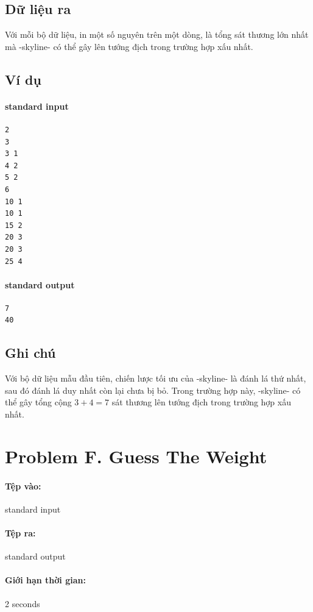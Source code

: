 \documentclass[11pt]{article}
\begin{document}
\subsection*{Dữ liệu ra}

Với mỗi bộ dữ liệu, in một số nguyên trên một dòng, là tổng sát thương lớn
nhất mà -skyline- có thể gây lên tướng địch trong trường hợp xấu nhất.

\subsection*{Ví dụ}

\paragraph{standard input}
\begin{verbatim}
2
3
3 1
4 2
5 2
6
10 1
10 1
15 2
20 3
20 3
25 4
\end{verbatim}

\paragraph{standard output}
\begin{verbatim}
7
40
\end{verbatim}

\subsection*{Ghi chú}

Với bộ dữ liệu mẫu đầu tiên, chiến lược tối ưu của -skyline- là đánh lá thứ
nhất, sau đó đánh lá duy nhất còn lại chưa bị bỏ. Trong trường hợp này,
-skyline- có thể gây tổng cộng \(3+4=7\) sát thương lên tướng địch trong
trường hợp xấu nhất.

\section{Problem F. Guess The Weight}

\paragraph{Tệp vào:} standard input
\paragraph{Tệp ra:} standard output
\paragraph{Giới hạn thời gian:} 2 seconds
\end{document}
